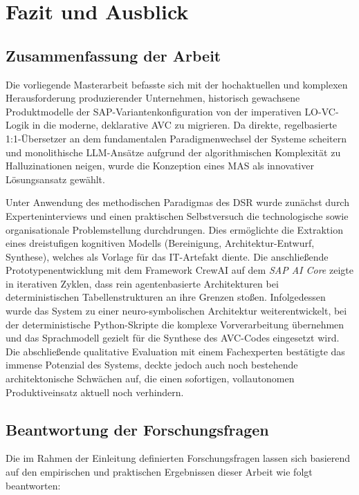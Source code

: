 \chapter{Fazit und Ausblick}
\label{sec:fazit_ausblick}

\section{Zusammenfassung der Arbeit}
\label{subsec:zusammenfassung}
Die vorliegende Masterarbeit befasste sich mit der hochaktuellen und komplexen Herausforderung produzierender Unternehmen, historisch gewachsene Produktmodelle der SAP-Variantenkonfiguration von der imperativen \ac{LO-VC}-Logik in die moderne, deklarative \ac{AVC} zu migrieren. Da direkte, regelbasierte 1:1-Übersetzer an dem fundamentalen Paradigmenwechsel der Systeme scheitern und monolithische \ac{LLM}-Ansätze aufgrund der algorithmischen Komplexität zu Halluzinationen neigen, wurde die Konzeption eines \ac{MAS} als innovativer Lösungsansatz gewählt.

Unter Anwendung des methodischen Paradigmas des \ac{DSR} wurde zunächst durch Experteninterviews und einen praktischen Selbstversuch die technologische sowie organisationale Problemstellung durchdrungen. Dies ermöglichte die Extraktion eines dreistufigen kognitiven Modells (Bereinigung, Architektur-Entwurf, Synthese), welches als Vorlage für das IT-Artefakt diente. Die anschließende Prototypenentwicklung mit dem Framework CrewAI auf dem \textit{SAP AI Core} zeigte in iterativen Zyklen, dass rein agentenbasierte Architekturen bei deterministischen Tabellenstrukturen an ihre Grenzen stoßen. Infolgedessen wurde das System zu einer neuro-symbolischen Architektur weiterentwickelt, bei der deterministische Python-Skripte die komplexe Vorverarbeitung übernehmen und das Sprachmodell gezielt für die Synthese des \ac{AVC}-Codes eingesetzt wird. Die abschließende qualitative Evaluation mit einem Fachexperten bestätigte das immense Potenzial des Systems, deckte jedoch auch noch bestehende architektonische Schwächen auf, die einen sofortigen, vollautonomen Produktiveinsatz aktuell noch verhindern.

\section{Beantwortung der Forschungsfragen}
\label{subsec:beantwortung_rqs}

Die im Rahmen der Einleitung definierten Forschungsfragen lassen sich basierend auf den empirischen und praktischen Ergebnissen dieser Arbeit wie folgt beantworten:

